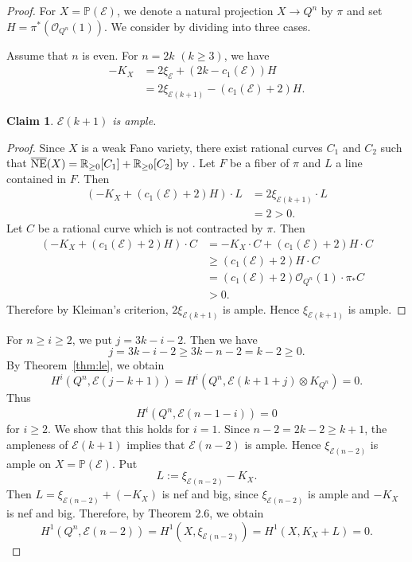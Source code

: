\documentclass{amsproc}
\newtheorem{claim}[theorem]{Claim}
\theoremstyle{definition}
\def\P{{\mathbb P}}
\def\R{{\mathbb R}}
\def\cE{{\mathcal E}}
\def\cO{{\mathcal{O}}}
\def\tensor{\otimes}
\def\cOperatorname#1{\mathop{\rm #1}\nolimits}
\def\NE{{\cOperatorname{NE}}}
\newcommand{\cNE}{\overline{\NE}}
\begin{document}
\begin{proof}
For $X=\P(\cE)$, we denote a natural projection $X\rightarrow Q^n$ by $\pi$ and set $H=\pi^*(\cO_{Q^n}(1))$. We consider by dividing into three cases.

Assume that $n$ is even. For $n=2k$ $(k\ge 3)$, we have
\begin{align*}
-K_X&=2\xi_{\cE}+(2k-c_1(\cE))H\\
&=2\xi_{\cE(k+1)}-(c_1(\cE)+2)H.
\end{align*}

\begin{claim}
$\cE(k+1)$ is ample.
\end{claim}

\begin{proof}
Since $X$ is a weak Fano variety, there exist rational curves $C_1$ and $C_2$ such that $\cNE(X)=\R_{\ge0}[C_1]+\R_{\ge0}[C_2]$ by \cite[Theorem~1.4(2)]{Y12}. Let $F$ be a fiber of $\pi$ and $L$ a line contained  in $F$. Then
\begin{align*}
(-K_X+(c_1(\cE)+2)H)\cdot L&=2\xi_{\cE(k+1)}\cdot L\\
&=2 > 0.
\end{align*}
Let $C$ be a rational curve which is not contracted by $\pi$. Then
\begin{align*}
(-K_X+(c_1(\cE)+2)H)\cdot C&=-K_X\cdot C+(c_1(\cE)+2)H\cdot C\\
&\ge(c_1(\cE)+2)H\cdot C\\
&=(c_1(\cE)+2)\cO_{Q^n}(1)\cdot \pi_*C\\
&>0.
\end{align*}
Therefore by Kleiman's criterion, $2\xi_{\cE(k+1)}$ is ample. Hence $\xi_{\cE(k+1)}$ is ample.
\end{proof}
For $n \ge i\ge 2$, we put $j=3k-i-2$. Then we have 
$$
j=3k-i-2\ge 3k-n-2=k-2\ge 0.
$$
By Theorem~\ref{thm:le}, we obtain 
$$
H^i(Q^n, \cE(j-k+1))=H^i(Q^n, \cE(k+1+j)\tensor K_{Q^n})=0.
$$
Thus
$$
H^i(Q^n, \cE(n-1-i))=0
$$
for $i\ge 2$.  
We show that this holds for \(i=1\). Since \(n-2=2k-2\geq k+1\),
the ampleness of \(\mathcal{E}(k+1)\) implies that
\(\mathcal{E}(n-2)\) is ample. Hence \(\xi_{\mathcal{E}(n-2)}\) is ample on
\(X=\mathbb{P}(\mathcal{E})\). Put
$$
L:=\xi_{\mathcal{E}(n-2)}-K_X.
$$
Then \(L=\xi_{\mathcal{E}(n-2)}+(-K_X)\) is nef and big, since
\(\xi_{\mathcal{E}(n-2)}\) is ample and \(-K_X\) is nef and big.
Therefore, by Theorem 2.6, we obtain
$$
H^1(Q^n,\mathcal{E}(n-2))
=
H^1(X,\xi_{\mathcal{E}(n-2)})
=
H^1(X,K_X+L)
=0.
$$


\end{proof}
\end{document}
